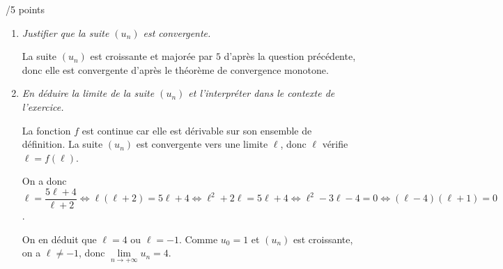 \documentclass[a4paper]{article}
\begin{document}
\begin{exerciceinterro}{\hspace{2cm}/5 points}{}
\begin{enumerate}
		\begin{align*}
			& 0\leqslant u_k \leqslant u_{k+1}  \leqslant  5 \\
			\iff & f(0) \leqslant f(u_k) \leqslant f(u_{k+1})  \leqslant  f(5) \text{ (car $f$ est strictement croissante)}\\
			\iff & 2 \leqslant u_{k+1} \leqslant u_{k+2}  \leqslant  \dfrac{29}{7} \\
			\Longrightarrow & 0 \leqslant u_{k+1} \leqslant u_{k+2}  \leqslant  5
		\end{align*}

		$\mathcal{P}(k+1)$ est donc vraie.

		\underline{Conclusion}:
		On a $P(0)$ vraie et pour tout entier $k$, $P(k) \Longrightarrow P(k+1)$, donc par le principe de récurrence, pour tout entier naturel $n$, $0 \leqslant u_n \leqslant u_{n+1}  \leqslant  5$.


		\item \textit{Justifier que la suite $\left(u_n\right)$ est convergente.}
		
		La suite $(u_n)$ est croissante et majorée par $5$ d'après la question précédente, donc elle est convergente d'après le théorème de convergence monotone.

\item \textit{En déduire la limite de la suite $\left(u_n\right)$ et l'interpréter dans le contexte de l'exercice.}

		La fonction $f$ est continue car elle est dérivable sur son ensemble de définition. La suite $(u_n)$ est convergente vers une limite $\ell$, donc $\ell$ vérifie $\ell=f(\ell)$.

		On a donc $\ell=\dfrac{5\ell+4}{\ell+2} \iff \ell(\ell+2)=5\ell+4 \iff \ell^2+2\ell=5\ell+4 \iff \ell^2-3\ell-4=0 \iff (\ell-4)(\ell+1)=0$.

		On en déduit que $\ell=4$ ou $\ell=-1$. Comme $u_0=1$ et $(u_n)$ est croissante, on a $\ell\neq -1$, donc $\lim\limits_{n \to +\infty} u_n=4$.


\end{enumerate}

\end{exerciceinterro}
\end{document}
